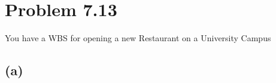 \documentclass{article}
\begin{document}
	\section*{Problem 7.13}
	You have a WBS for opening a new Restaurant on a University Campus
	\subsection*{\quad(a)}
		\begin{center}
			
		\end{center}
\end{document}
